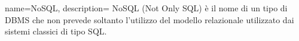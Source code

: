  {
name=NoSQL,
description={
NoSQL (Not Only SQL) è il nome di un tipo di DBMS che non prevede soltanto
l'utilizzo del modello relazionale utilizzato dai sistemi classici di tipo SQL.
}
}

